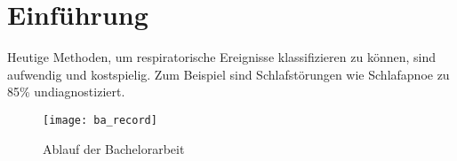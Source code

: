 
\chapter{Einführung}
\label{ch:Introduction}

Heutige Methoden, um respiratorische Ereignisse klassifizieren zu können, sind aufwendig und kostspielig. 
Zum Beispiel sind Schlafstörungen wie Schlafapnoe zu 85\% undiagnostiziert.

\begin{figure}[ht]
    \centering
    \texttt{[image: ba\_record]}
    \caption{Ablauf der Bachelorarbeit}
    \label{introduction:ba_record}
  \end{figure}